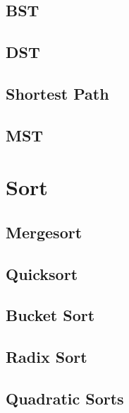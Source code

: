\documentclass[12pt,letterpaper]{article} \usepackage{amsmath} \usepackage{graphicx} \usepackage[margin=1in]{geometry} \usepackage{longtable}  \usepackage{amssymb}
\begin{document}
	\subsection{BST}
	
	\subsection{DST}
	
	\subsection{Shortest Path}
	
	\subsection{MST}
	
	\section{Sort}
	
	\subsection{Mergesort}
	
	\subsection{Quicksort}
	
	\subsection{Bucket Sort}
	
	\subsection{Radix Sort}
	
	\subsection{Quadratic Sorts}
	
	
	
	
	
	
	
\end{document}

